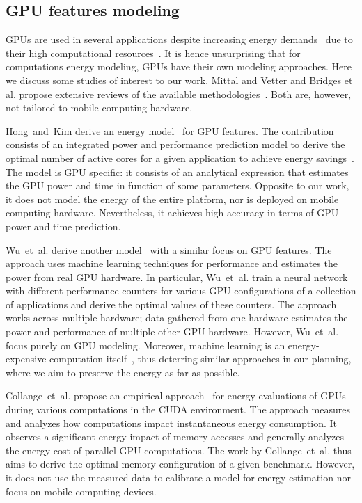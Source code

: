 \subsection{GPU features modeling}

GPUs are used in several applications despite increasing energy demands~\citep{mittal2014survey} due to their high computational resources~\citep{kasichayanula2012power}. It is hence unsurprising that for computations energy modeling, GPUs have their own modeling approaches. Here we discuss some studies of interest to our work. Mittal and Vetter and Bridges et al. propose extensive reviews of the available methodologies~\citep{bridges2016understanding,mittal2014survey}. Both are, however, not tailored to mobile computing hardware.

Hong~and~Kim derive an energy model~\citep{hong2010integrated} for GPU features. The contribution consists of an integrated power and performance prediction model to derive the optimal number of active cores for a given application to achieve energy savings~\citep{hong2010integrated}. The model is GPU specific: it consists of an analytical expression that estimates the GPU power and time in function of some parameters. Opposite to our work, it does not model the energy of the entire platform, nor is deployed on mobile computing hardware. Nevertheless, it achieves high accuracy in terms of GPU power and time prediction.

Wu~et~al. derive another model~\citep{wu2015gpgpu} with a similar focus on GPU features. The approach uses machine learning techniques for performance and estimates the power from real GPU hardware. In particular, Wu~et~al. train a neural network with different performance counters for various GPU configurations of a collection of applications and derive the optimal values of these counters. The approach works across multiple hardware; data gathered from one hardware estimates the power and performance of multiple other GPU hardware. However, Wu~et~al. focus purely on GPU modeling. Moreover, machine learning is an energy-expensive computation itself~\citep{garcia2019estimation,yang2017method}, thus deterring similar approaches in our planning, where we aim to preserve the energy as far as possible.

Collange~et~al. propose an empirical approach~\citep{collange2009power} for energy evaluations of GPUs during various computations in the CUDA environment. The approach measures and analyzes how computations impact instantaneous energy consumption. It observes a significant energy impact of memory accesses and generally analyzes the energy cost of parallel GPU computations. The work by Collange~et~al. thus aims to derive the optimal memory configuration of a given benchmark. However, it does not use the measured data to calibrate a model for energy estimation nor focus on mobile computing devices.


